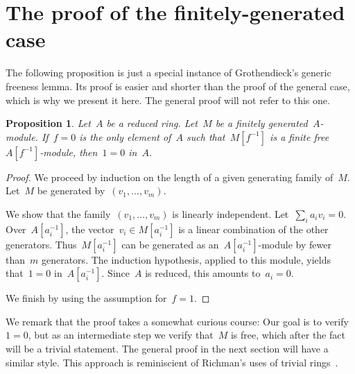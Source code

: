 \documentclass[oneside]{amsart}
\theoremstyle{definition}
\theoremstyle{plain}
\newtheorem{prop}[defn]{Proposition}
\theoremstyle{remark}
\begin{document}
\section{The proof of the finitely-generated case}

The following proposition is just a special instance of Grothendieck's generic
freeness lemma. Its proof is easier and shorter than the proof of the general
case, which is why we present it here. The general proof
will not refer to this one.

\begin{prop}Let~$A$ be a reduced ring. Let~$M$ be a finitely
generated~$A$-module. If~$f = 0$ is the only element of~$A$ such
that~$M[f^{-1}]$ is a finite free~$A[f^{-1}]$-module, then~$1 = 0$ in~$A$.
\end{prop}

\begin{proof}We proceed by induction on the length of a given generating family
of~$M$. Let~$M$ be generated by~$(v_1,\ldots,v_m)$.

We show that the family~$(v_1,\ldots,v_m)$ is linearly independent. Let~$\sum_i
a_i v_i = 0$. Over~$A[a_i^{-1}]$, the vector~$v_i \in M[a_i^{-1}]$ is a linear
combination of the other generators. Thus~$M[a_i^{-1}]$ can be generated as
an~$A[a_i^{-1}]$-module by fewer than~$m$ generators. The induction hypothesis,
applied to this module, yields that~$1 = 0$ in~$A[a_i^{-1}]$. Since~$A$ is
reduced, this amounts to~$a_i = 0$.

We finish by using the assumption for~$f = 1$.
\end{proof}

We remark that the proof takes a somewhat curious course: Our goal is to
verify~$1 = 0$, but as an intermediate step we verify that~$M$ is free, which
after the fact will be a trivial statement. The general proof in the next
section will have a similar style. This approach is reminiscient of
Richman's uses of trivial rings~\cite{richman:trivial-rings}.
\enlargethispage{8em}
\end{document}
